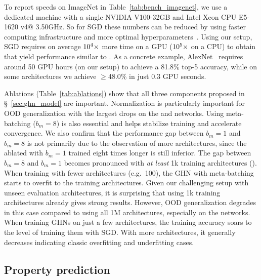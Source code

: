 To report speeds on ImageNet in Table~\ref{tab:bench_imagenet}, we use a dedicated machine with a single NVIDIA V100-32GB and Intel Xeon CPU E5-1620 v4@ 3.50GHz. So for SGD these numbers can be reduced by using faster computing infrastructure and more optimal hyperparameters~\citep{goyal2017accurate}.
Using our setup, SGD requires on average $10^4 {\mkern-0.1mu\times\mkern-0.1mu}$ more time on a GPU ($10^5 {\mkern-0.1mu\times\mkern-0.1mu}$ on a CPU) to obtain \params that yield performance similar to \ghnours.
As a concrete example, AlexNet~\citep{krizhevsky2012imagenet} requires around 50 GPU hours (on our setup) to achieve a 81.8\% top-5 accuracy, while on some architectures we achieve $\geq$48.0\% in just 0.3 GPU seconds.



Ablations (Table~\ref{tab:ablations}) show that all three components proposed in \S~\ref{sec:ghn_model} are important. Normalization is particularly important for OOD generalization with the largest drops on the \wide and \bnfree networks. %
Using meta-batching ($b_m = 8$) is also essential and helps stabilize training and accelerate convergence. %
We also confirm that the performance gap between $b_m = 1$ and $b_m = 8$ is not primarily due to the observation of more architectures, since the ablated \ghnours with $b_m = 1$ trained eight times longer is still inferior.
The gap between $b_m = 8$ and $b_m = 1$ becomes pronounced with \emph{at least} 1k training architectures (\fig{\ref{fig:acc_arch}}).
When training with fewer architectures (e.g.~100), the GHN with meta-batching starts to overfit to the training architectures.
Given our challenging setup with unseen evaluation architectures, it is surprising that using 1k training architectures already gives strong results. However, OOD generalization degrades in this case compared to using all 1M architectures, especially on the \bnfree networks. %
When training GHNs on just a few architectures, the training accuracy soars to the level of training them with SGD. With more architectures, it generally decreases indicating classic overfitting and underfitting cases.


\subsection{Property prediction\label{sec:prop_pred}}

